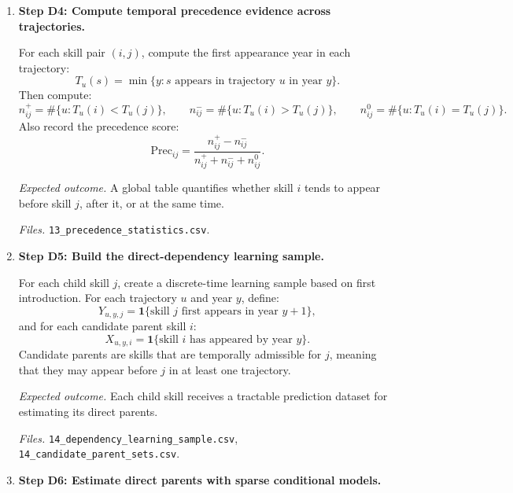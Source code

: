 \begin{enumerate}
    \textit{Expected outcome.}
    Only temporally admissible candidate prerequisite pairs remain in the directed branch.
    Same-time relations are preserved separately rather than forced into the DAG.

    \textit{Files.}
    \texttt{12\_temporal\_pair\_registry.csv},
    \texttt{12\_corequisite\_candidates.csv}.

    \item \textbf{Step D4: Compute temporal precedence evidence across trajectories.}

    For each skill pair $(i,j)$, compute the first appearance year in each trajectory:
    \[
    T_u(s) = \min \{ y : s \text{ appears in trajectory } u \text{ in year } y \}.
    \]
    Then compute:
    \[
    n^+_{ij} = \#\{u : T_u(i) < T_u(j)\}, \qquad
    n^-_{ij} = \#\{u : T_u(i) > T_u(j)\}, \qquad
    n^0_{ij} = \#\{u : T_u(i) = T_u(j)\}.
    \]
    Also record the precedence score:
    \[
    \mathrm{Prec}_{ij}
    =
    \frac{n^+_{ij} - n^-_{ij}}{n^+_{ij} + n^-_{ij} + n^0_{ij}}.
    \]

    \textit{Expected outcome.}
    A global table quantifies whether skill $i$ tends to appear before skill $j$, after it,
    or at the same time.

    \textit{Files.}
    \texttt{13\_precedence\_statistics.csv}.

    \item \textbf{Step D5: Build the direct-dependency learning sample.}

    For each child skill $j$, create a discrete-time learning sample based on first introduction.
    For each trajectory $u$ and year $y$, define:
    \[
    Y_{u,y,j}
    =
    \mathbf{1}\{\text{skill } j \text{ first appears in year } y+1\},
    \]
    and for each candidate parent skill $i$:
    \[
    X_{u,y,i}
    =
    \mathbf{1}\{\text{skill } i \text{ has appeared by year } y\}.
    \]
    Candidate parents are skills that are temporally admissible for $j$, meaning that they may
    appear before $j$ in at least one trajectory.

    \textit{Expected outcome.}
    Each child skill receives a tractable prediction dataset for estimating its direct parents.

    \textit{Files.}
    \texttt{14\_dependency\_learning\_sample.csv},
    \texttt{14\_candidate\_parent\_sets.csv}.

    \item \textbf{Step D6: Estimate direct parents with sparse conditional models.}


\end{enumerate}
